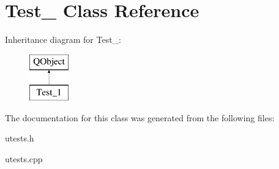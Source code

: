 \hypertarget{classTest__1}{\section{Test\-\_ Class Reference}
\label{classTest__1}
}
Inheritance diagram for Test\-\_\-:\begin{figure}[H]
\begin{center}
\leavevmode
\includegraphics[height=2.000000cm]{classTest__1}
\end{center}
\end{figure}


The documentation for this class was generated from the following files\-:\begin{DoxyCompactItemize}
\item 
utests.\-h\item 
utests.\-cpp\end{DoxyCompactItemize}
